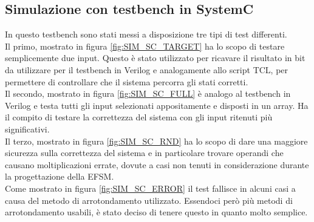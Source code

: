 \documentclass[]{IEEEtran}
\begin{document}
\subsection{Simulazione con testbench in SystemC}
In questo testbench sono stati messi a disposizione tre tipi di test differenti.
\\Il primo, mostrato in figura \ref{fig:SIM_SC_TARGET} ha lo scopo di testare semplicemente due input. Questo è stato utilizzato per ricavare il risultato in bit da utilizzare per il testbench in Verilog e analogamente allo script TCL, per permettere di controllare che il sistema percorra gli stati corretti.
\\Il secondo, mostrato in figura \ref{fig:SIM_SC_FULL} è analogo al testbench in Verilog e testa tutti gli input selezionati appositamente e disposti in un array. Ha il compito di testare la correttezza del sistema con gli input ritenuti più significativi.
\\Il terzo, mostrato in figura \ref{fig:SIM_SC_RND} ha lo scopo di dare una maggiore sicurezza sulla correttezza del sistema e in particolare trovare operandi che causano moltiplicazioni errate, dovute a casi non tenuti in considerazione durante la progettazione della EFSM.
\\Come mostrato in figura \ref{fig:SIM_SC_ERROR} il test fallisce in alcuni casi a causa del metodo di arrotondamento utilizzato. Essendoci però più metodi di arrotondamento usabili, è stato deciso di tenere questo in quanto molto semplice.
\end{document}
